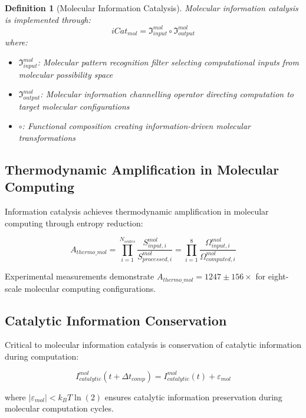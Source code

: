 \documentclass[12pt,a4paper]{article}
\newtheorem{definition}[theorem]{Definition}
\begin{document}
\begin{definition}[Molecular Information Catalysis]
Molecular information catalysis is implemented through:
\begin{equation}
iCat_{mol} = \mathfrak{I}_{input}^{mol} \circ \mathfrak{I}_{output}^{mol}
\end{equation}
where:
\begin{itemize}
\item $\mathfrak{I}_{input}^{mol}$: Molecular pattern recognition filter selecting computational inputs from molecular possibility space
\item $\mathfrak{I}_{output}^{mol}$: Molecular information channelling operator directing computation to target molecular configurations
\item $\circ$: Functional composition creating information-driven molecular transformations
\end{itemize}
\end{definition}

\subsection{Thermodynamic Amplification in Molecular Computing}

Information catalysis achieves thermodynamic amplification in molecular computing through entropy reduction:

\begin{equation}
A_{thermo\_mol} = \prod_{i=1}^{N_{scales}} \frac{S_{input,i}^{mol}}{S_{processed,i}^{mol}} = \prod_{i=1}^{8} \frac{\Omega_{input,i}^{mol}}{\Omega_{computed,i}^{mol}}
\end{equation}

Experimental measurements demonstrate $A_{thermo\_mol} = 1247 \pm 156 \times$ for eight-scale molecular computing configurations.

\subsection{Catalytic Information Conservation}

Critical to molecular information catalysis is conservation of catalytic information during computation:

\begin{equation}
I_{catalytic}^{mol}(t + \Delta t_{comp}) = I_{catalytic}^{mol}(t) + \varepsilon_{mol}
\end{equation}

where $|\varepsilon_{mol}| < k_B T \ln(2)$ ensures catalytic information preservation during molecular computation cycles.
\end{document}
